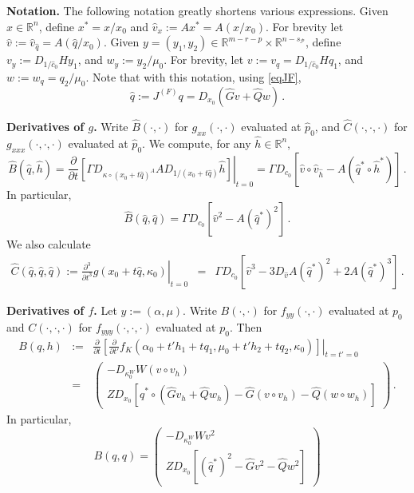 \documentclass[11pt]{amsart}
\renewcommand{\k}{\kappa}
\newcommand{\R}{\mathbb{R}}
\newcommand{\wQ}{\widehat{Q}}
\newcommand{\wG}{\widehat{G}}
\newcommand{\wB}{\widehat{B}}
\newcommand{\wC}{\widehat{C}}
\newcommand{\mP}{\mathcal{P}}
\theoremstyle{definition}
\begin{document}
{\bf Notation.} The following notation greatly shortens various expressions. Given $x \in \R^n$, define $x^* = x/x_0$ and $\hat{v}_x := Ax^* = A(x/x_0)$. For brevity let $\hat{v} := \hat{v}_{\hat{q}} = A(\hat{q}/x_0)$. Given $y = (y_1, y_2) \in \R^{m-r-p} \times \R^{n-s_{\mP}}$, define $v_y := D_{1/\hat{c}_0}H y_1$, and $w_y := y_2/\mu_0$. For brevity, let $v:= v_q = D_{1/\hat{c}_0}H q_1$, and $w := w_q = q_2/\mu_0$. Note that with this notation, using \eqref{eqJF},
\begin{equation}
\label{eqhatq}
\hat{q}:= J^{(F)}q = D_{x_0}(\wG v + \wQ w)\,.
\end{equation}


{\bf Derivatives of $g$.} Write $\wB(\cdot, \cdot)$ for $g_{xx}(\cdot, \cdot)$ evaluated at $\hat{p}_0$, and $\wC(\cdot, \cdot, \cdot)$ for $g_{xxx}(\cdot, \cdot, \cdot)$ evaluated at $\hat{p}_0$. We compute, for any $\hat{h} \in \R^n$,
\begin{equation}
\label{eqwbhat1}
\wB(\hat{q},\hat{h}) = \left.\frac{\partial}{\partial t}\left[\Gamma D_{\k\circ(x_0 + t\hat{q})^A} A D_{1/(x_0 + t\hat{q})} \hat{h}\right]\right|_{t=0} =  \Gamma D_{c_0} \left[\hat{v}\circ \hat{v}_{\hat{h}} - A(\hat{q}^*\circ \hat{h}^*)\right]\,.
\end{equation}
In particular,
\begin{equation}
\label{eqwbhat}
\wB(\hat{q},\hat{q}) = \Gamma D_{c_0}\left[\hat{v}^2  -A(\hat{q}^*)^2\right]\,.
\end{equation}
We also calculate
\begin{eqnarray}
\label{eqwchat}
\wC (\hat{q},\hat{q},\hat{q}):= \left.\frac{\partial^3}{\partial t^3}g(x_0 + t\hat{q}, \k_0)\right|_{t=0} 
&=& \Gamma D_{c_0}\left[\hat{v}^3 - 3D_{\hat{v}}A (\hat{q}^*)^2 + 2A(\hat{q}^*)^3\right]\,.
\end{eqnarray}

{\bf Derivatives of $f$.} Let $y := (\alpha, \mu)$. Write $B(\cdot, \cdot)$ for $f_{yy}(\cdot, \cdot)$ evaluated at $p_0$ and $C(\cdot, \cdot, \cdot)$ for $f_{yyy}(\cdot, \cdot, \cdot)$ evaluated at $p_0$. Then
\begin{eqnarray}
\label{eqwb1}
B(q,h) &:=& \left.\frac{\partial}{\partial t}\left[\frac{\partial}{\partial t'} f_K(\alpha_0 + t'h_1 + tq_1, \mu_0 + t'h_2 + tq_2, \k_0)\right]\right|_{t=t'=0}\\ \nonumber 
&=& \left(\begin{array}{c}-D_{\k_0^W} W (v\circ v_h)\\Z D_{x_0} [\hat{q}^*\circ(\wG v_h + \wQ w_h) - \wG (v \circ v_h) - \wQ (w\circ w_h)]\end{array}\right)\,.
\end{eqnarray}
In particular,
\begin{equation}
\label{eqwb}
B(q,q) = \left(\begin{array}{c}-D_{\k_0^W}W v^2\\Z D_{x_0}[(\hat{q}^*)^2 - \wG v^2 -\wQ w^2]\end{array}\right)
\end{equation}
\end{document}
